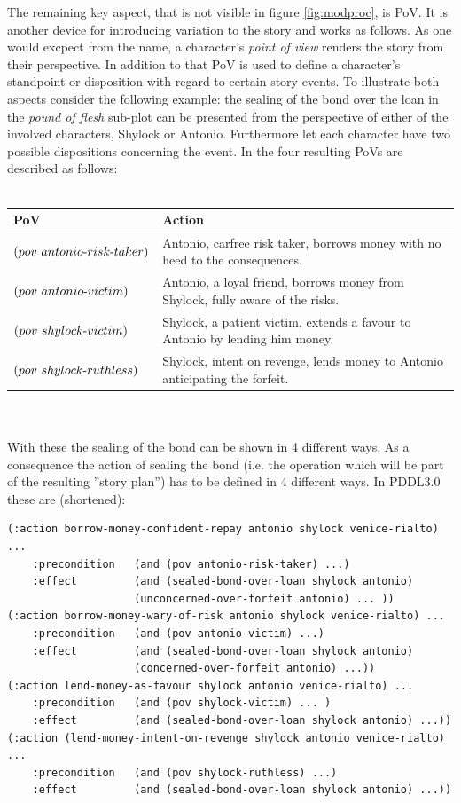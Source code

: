 The remaining key aspect, that is not visible in figure \ref{fig:modproc}, is PoV. It is another device for introducing variation to the story and works as follows. As one would excpect from the name, a character's \emph{point of view} renders the story from their perspective. In addition to that PoV is used to define a character's standpoint or disposition with regard to certain story events. To illustrate both aspects consider the following example: the sealing of the bond over the loan in the \emph{pound of flesh} sub-plot can be presented from the perspective of either of the involved characters, Shylock or Antonio. Furthermore let each character have two possible dispositions concerning the event. In \cite{Porteous10} the four resulting PoVs are described as follows:\\
\\
\begin{tabular}{|p{4.5cm}|p{8.5cm}|}
\hline
PoV & Action \\
\hline\hline
$(pov\ antonio\text{-} risk\text{-} taker)$ & Antonio, carfree risk taker, borrows money with no heed to the consequences.\\
\hline
$(pov\ antonio\text{-} victim)$ & Antonio, a loyal friend, borrows money from Shylock, fully aware of the risks.\\
\hline
$(pov\ shylock\text{-} victim)$ & Shylock, a patient victim, extends a favour to Antonio by lending him money.\\
\hline
$(pov\ shylock\text{-} ruthless)$ & Shylock, intent on revenge, lends money to Antonio anticipating the forfeit.\\
\hline
\end{tabular}\\
\\
With these the sealing of the bond can be shown in 4 different ways. As a consequence the action of sealing the bond (i.e. the operation which will be part of the resulting ''story plan'') has to be defined in 4 different ways. In PDDL3.0 these are (shortened):
\begin{lstlisting}[frame=single,basicstyle=\scriptsize]
(:action borrow-money-confident-repay antonio shylock venice-rialto) ...
    :precondition   (and (pov antonio-risk-taker) ...)
    :effect         (and (sealed-bond-over-loan shylock antonio)
                    (unconcerned-over-forfeit antonio) ... ))
(:action borrow-money-wary-of-risk antonio shylock venice-rialto) ...
    :precondition   (and (pov antonio-victim) ...)
    :effect         (and (sealed-bond-over-loan shylock antonio)
                    (concerned-over-forfeit antonio) ...))
(:action lend-money-as-favour shylock antonio venice-rialto) ...
    :precondition   (and (pov shylock-victim) ... )
    :effect         (and (sealed-bond-over-loan shylock antonio) ...))
(:action (lend-money-intent-on-revenge shylock antonio venice-rialto) ...
    :precondition   (and (pov shylock-ruthless) ...)
    :effect         (and (sealed-bond-over-loan shylock antonio) ...))
\end{lstlisting}
